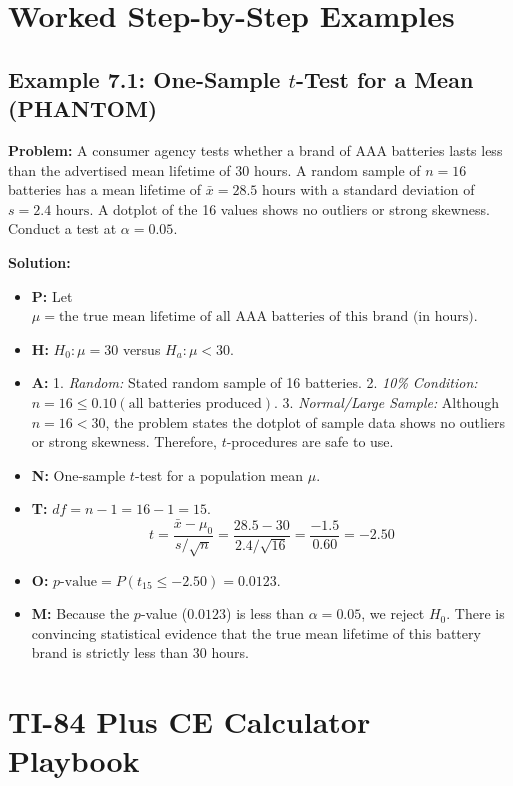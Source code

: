 \section{Worked Step-by-Step Examples}

\subsection*{Example 7.1: One-Sample $t$-Test for a Mean (PHANTOM)}
\textbf{Problem:} A consumer agency tests whether a brand of AAA batteries lasts less than the advertised mean lifetime of 30 hours. A random sample of $n = 16$ batteries has a mean lifetime of $\bar{x} = 28.5\text{ hours}$ with a standard deviation of $s = 2.4\text{ hours}$. A dotplot of the 16 values shows no outliers or strong skewness. Conduct a test at $\alpha = 0.05$.

\textbf{Solution:}
\begin{itemize}[leftmargin=1.2em]
  \item \textbf{P:} Let $\mu = \text{the true mean lifetime of all AAA batteries of this brand (in hours)}$.
  \item \textbf{H:} $H_0: \mu = 30$ versus $H_a: \mu < 30$.
  \item \textbf{A:}
  1. \textit{Random:} Stated random sample of 16 batteries.
  2. \textit{10\% Condition:} $n = 16 \le 0.10(\text{all batteries produced})$.
  3. \textit{Normal/Large Sample:} Although $n = 16 < 30$, the problem states the dotplot of sample data shows no outliers or strong skewness. Therefore, $t$-procedures are safe to use.
  \item \textbf{N:} One-sample $t$-test for a population mean $\mu$.
  \item \textbf{T:} $df = n - 1 = 16 - 1 = 15$.
  \[ t = \frac{\bar{x} - \mu_0}{s / \sqrt{n}} = \frac{28.5 - 30}{2.4 / \sqrt{16}} = \frac{-1.5}{0.60} = -2.50 \]
  \item \textbf{O:} $p\text{-value} = P(t_{15} \le -2.50) = \mathbf{0.0123}$.
  \item \textbf{M:} Because the $p$-value ($0.0123$) is less than $\alpha = 0.05$, we reject $H_0$. There is convincing statistical evidence that the true mean lifetime of this battery brand is strictly less than 30 hours.
\end{itemize}

\section{TI-84 Plus CE Calculator Playbook}

